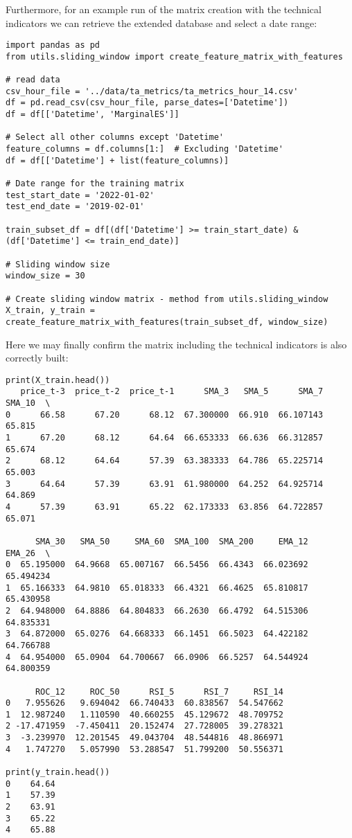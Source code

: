 \documentclass[12pt]{report} %
\begin{document}
Furthermore, for an example run of the matrix creation with the technical indicators we can retrieve the extended database and select a date range:
\begin{lstlisting}
import pandas as pd
from utils.sliding_window import create_feature_matrix_with_features

# read data
csv_hour_file = '../data/ta_metrics/ta_metrics_hour_14.csv'
df = pd.read_csv(csv_hour_file, parse_dates=['Datetime'])
df = df[['Datetime', 'MarginalES']]

# Select all other columns except 'Datetime'
feature_columns = df.columns[1:]  # Excluding 'Datetime'
df = df[['Datetime'] + list(feature_columns)]

# Date range for the training matrix
test_start_date = '2022-01-02'
test_end_date = '2019-02-01'

train_subset_df = df[(df['Datetime'] >= train_start_date) & (df['Datetime'] <= train_end_date)]

# Sliding window size
window_size = 30

# Create sliding window matrix - method from utils.sliding_window
X_train, y_train = create_feature_matrix_with_features(train_subset_df, window_size)
\end{lstlisting}

Here we may finally confirm the matrix including the technical indicators is also correctly built:
\begin{small}
\begin{verbatim}
print(X_train.head())
   price_t-3  price_t-2  price_t-1      SMA_3   SMA_5      SMA_7  SMA_10  \
0      66.58      67.20      68.12  67.300000  66.910  66.107143  65.815   
1      67.20      68.12      64.64  66.653333  66.636  66.312857  65.674   
2      68.12      64.64      57.39  63.383333  64.786  65.225714  65.003   
3      64.64      57.39      63.91  61.980000  64.252  64.925714  64.869   
4      57.39      63.91      65.22  62.173333  63.856  64.722857  65.071   

      SMA_30   SMA_50     SMA_60  SMA_100  SMA_200     EMA_12     EMA_26  \
0  65.195000  64.9668  65.007167  66.5456  66.4343  66.023692  65.494234   
1  65.166333  64.9810  65.018333  66.4321  66.4625  65.810817  65.430958   
2  64.948000  64.8886  64.804833  66.2630  66.4792  64.515306  64.835331   
3  64.872000  65.0276  64.668333  66.1451  66.5023  64.422182  64.766788   
4  64.954000  65.0904  64.700667  66.0906  66.5257  64.544924  64.800359   

      ROC_12     ROC_50      RSI_5      RSI_7     RSI_14  
0   7.955626   9.694042  66.740433  60.838567  54.547662  
1  12.987240   1.110590  40.660255  45.129672  48.709752  
2 -17.471959  -7.450411  20.152474  27.728005  39.278321  
3  -3.239970  12.201545  49.043704  48.544816  48.866971  
4   1.747270   5.057990  53.288547  51.799200  50.556371

print(y_train.head())
0    64.64
1    57.39
2    63.91
3    65.22
4    65.88
\end{verbatim}
\end{small}
\end{document}
